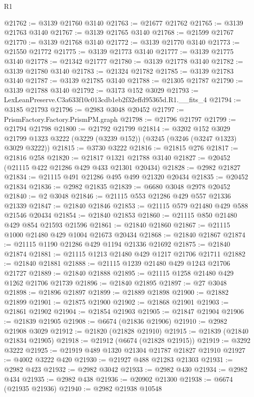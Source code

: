\begin{lexlean}{R1}
\begin{coremodule}
@21762 := @3139 @21760 @3140
@21763 := @21677 @21762
@21765 := @3139 @21763 @3140
@21767 := @3139 @21765 @3140
@21768 := @21599 @21767
@21770 := @3139 @21768 @3140
@21772 := @3139 @21770 @3140
@21773 := @21550 @21772
@21775 := @3139 @21773 @3140
@21777 := @3139 @21775 @3140
@21778 := @21342 @21777
@21780 := @3139 @21778 @3140
@21782 := @3139 @21780 @3140
@21783 := @21324 @21782
@21785 := @3139 @21783 @3140
@21787 := @3139 @21785 @3140
@21788 := @21305 @21787
@21790 := @3139 @21788 @3140
@21792 := @3173 @152 @3029
@21793 := LexLeanPreserve.C3a633f10c013cdb1eb2f32effd95365d.R1.__fits_4
@21794 := @3185 @21793
@21796 := @2983 @3048 @20452
@21797 := PrismFactory.Factory.PrismPM.graph
@21798 := @21796 @21797
@21799 := @21794 @21798
@21800 := @21792 @21799
@21814 := @3202
    @152
    @3029
    @21799
    @1323
    @3222
    (@3229 (@3239 @152))
    (@3245 (@3246 (@3247 @1323) @3029 @3222))
@21815 := @3730 @3222
@21816 := @21815 @276
@21817 := @21816 @258
@21820 := @21817 @1321 @21788 @3140
@21827 := @20452 (@21115 @422 @21286 @429 @433 @21301 @20434)
@21828 := @2982 @21827
@21834 := @21115 @491 @21286 @495 @499 @21320 @20434
@21835 := @20452 @21834
@21836 := @2982 @21835
@21839 := @6680 @3048 @2978 @20452
@21840 := @2 @3048
@21846 := @21115 @553 @21286 @429 @557 @21336 @21339
@21847 := @21840 @21846
@21853 := @21115 @579 @21480 @429 @588 @21546 @20434
@21854 := @21840 @21853
@21860 := @21115 @850 @21480 @429 @854 @21593 @21596
@21861 := @21840 @21860
@21867 := @21115 @1000 @21480 @429 @1004 @21673 @20434
@21868 := @21840 @21867
@21874 := @21115 @1190 @21286 @429 @1194 @21336 @21692
@21875 := @21840 @21874
@21881 := @21115 @1213 @21480 @429 @1217 @21706 @21711
@21882 := @21840 @21881
@21888 := @21115 @1239 @21480 @429 @1243 @21706 @21727
@21889 := @21840 @21888
@21895 := @21115 @1258 @21480 @429 @1262 @21706 @21739
@21896 := @21840 @21895
@21897 := @27 @3048
@21898 := @21896 @21897
@21899 := @21889 @21898
@21900 := @21882 @21899
@21901 := @21875 @21900
@21902 := @21868 @21901
@21903 := @21861 @21902
@21904 := @21854 @21903
@21905 := @21847 @21904
@21906 := @21839 @21905
@21908 := @6674 (@21836 @21906)
@21910 := @2982 @21908 @3029
@21912 := @21820 (@21828 @21910)
@21915 := @21839 (@21840 @21834 @21905)
@21918 := @21912 (@6674 (@21828 @21915))
@21919 := @3292 @3222
@21925 := @21919 @489 @1320 @21304 @21787 @21827 @21910
@21927 := @4002 @3222 @420
@21930 := @21927 @488 @21283 @21303
@21931 := @2982 @423
@21932 := @2982 @3042
@21933 := @2982 @430
@21934 := @2982 @434
@21935 := @2982 @438
@21936 := @20902 @21300
@21938 := @6674 (@21935 @21936)
@21940 := @2982 @21938 @10548

\end{coremodule}
\end{lexlean}
